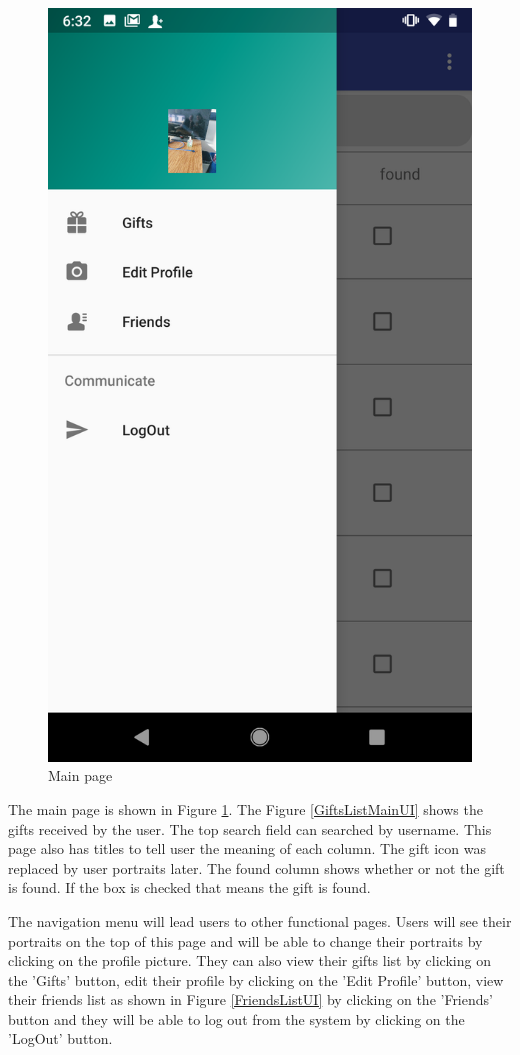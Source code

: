 \begin{figure}[htb]
\begin{minipage}[t]{0.5\textwidth}
\includegraphics[width=.95\textwidth]{section03/assets/MainPortrait.png}
\subcaption{\label{FunctionsMainUI}}
\end{minipage}%
\caption[Short Caption 2]{\label{MainPageUI}Main page}
\end{figure}
\par The main page is shown in Figure \ref{MainPageUI}. The Figure \ref{GiftsListMainUI} shows the gifts received by the user. The top search field can searched by username. This page also has titles to tell user the meaning of each column. The gift icon was replaced by user portraits later. The found column shows whether or not the gift is found. If the box is checked that means the gift is found.
\par The navigation menu will lead users to other functional pages. Users will see their portraits on the top of this page and will be able to change their portraits by clicking on the profile picture. They can also view their gifts list by clicking on the 'Gifts' button, edit their profile by clicking on the 'Edit Profile' button, view their friends list as shown in Figure \ref{FriendsListUI} by clicking on the 'Friends' button and they will be able to log out from the system by clicking on the 'LogOut' button. 

